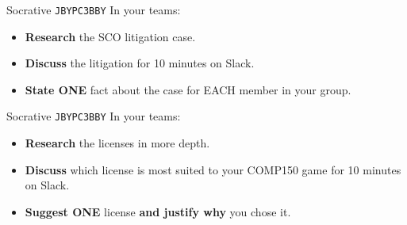 \begin{frame}[fragile]{Socrative \texttt{JBYPC3BBY}}
In your teams:
	\begin{itemize}
		
		\item \textbf{Research} the SCO litigation case.
		\item \textbf{Discuss} the litigation for 10 minutes on Slack.
	
		\item \textbf{State ONE} fact about the case for EACH member in your group.
	\end{itemize}
\end{frame}

\begin{frame}[fragile]{Socrative \texttt{JBYPC3BBY}}
In your teams:
	\begin{itemize}
		
		\item \textbf{Research} the licenses in more depth.
		\item \textbf{Discuss} which license is most suited to your COMP150 game for 10 minutes on Slack.
	
		\item \textbf{Suggest ONE} license \textbf{and justify why} you chose it.
	\end{itemize}
\end{frame}